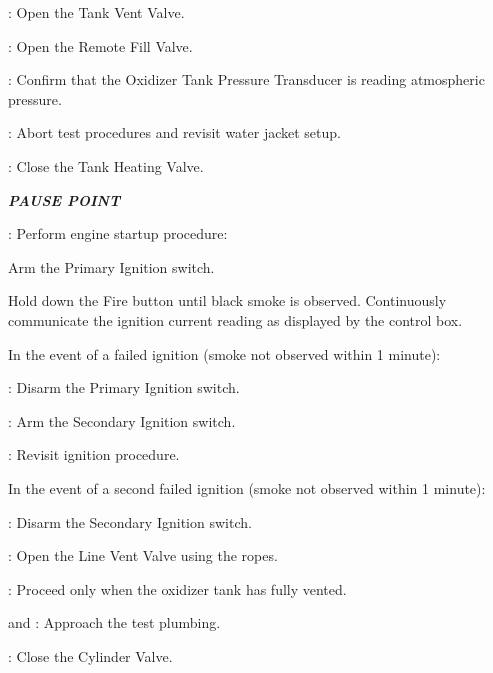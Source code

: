 \begin{checklist}
\begin{checklist}[label=$\bullet$]
\begin{checklist}
            \item \control{}: Open the Tank Vent Valve.
            \item \control{}: Open the Remote Fill Valve.
            \item \daq{}: Confirm that the Oxidizer Tank Pressure Transducer is reading atmospheric pressure.
            \item \ops{}: Abort test procedures and revisit water jacket setup.
        \end{checklist}
    \end{checklist}
    \item \heat{}: Close the Tank Heating Valve.
    \item \textbf{\textit{PAUSE POINT}}
    \item \control{}: Perform engine startup procedure:
    \begin{checklist}
        \item Arm the Primary Ignition switch.
        \item Hold down the Fire button until black smoke is observed. Continuously communicate the ignition current reading as displayed by the control box.
        \begin{checklist}[label=$\bullet$]
            \item In the event of a failed ignition (smoke not observed within 1 minute):
            \begin{checklist}
                \item \control{}: Disarm the Primary Ignition switch.
                \item \control{}: Arm the Secondary Ignition switch.
                \item \ops{}: Revisit ignition procedure.
            \end{checklist}
            \item In the event of a second failed ignition (smoke not observed within 1 minute):
            \begin{checklist}
                \item \control{}: Disarm the Secondary Ignition switch.
                \item \primary{}: Open the Line Vent Valve using the ropes.
                \item \ops{}: Proceed only when the oxidizer tank has fully vented.
                \item \primary{} and \secondary{}: Approach the test plumbing.
                \item \primary{}: Close the Cylinder Valve.

\end{checklist}
\end{checklist}
\end{checklist}
\end{checklist}
